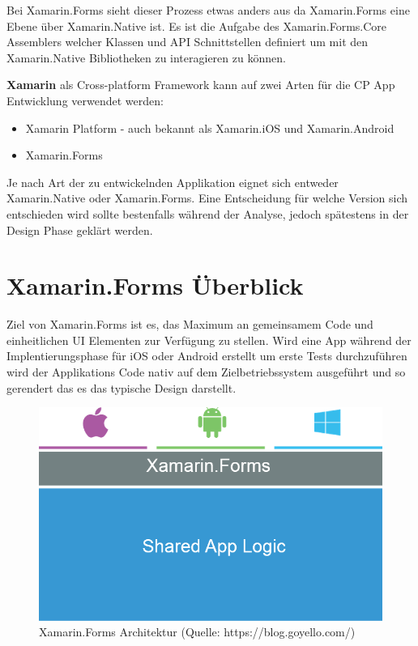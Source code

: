 	Bei Xamarin.Forms sieht dieser Prozess etwas anders aus da Xamarin.Forms eine Ebene über Xamarin.Native ist. Es ist die Aufgabe des Xamarin.Forms.Core Assemblers welcher Klassen und API Schnittstellen definiert um mit den Xamarin.Native Bibliotheken zu interagieren zu können.

	\textbf{Xamarin} als Cross-platform Framework kann auf zwei Arten für die CP App Entwicklung verwendet werden:
	\begin{itemize}
		\setlength\itemsep{0em}
		\item Xamarin Platform - auch bekannt als Xamarin.iOS und Xamarin.Android
		\item Xamarin.Forms
	\end{itemize}
	Je nach Art der zu entwickelnden Applikation eignet sich entweder Xamarin.Native oder Xamarin.Forms. Eine Entscheidung für welche Version sich entschieden wird sollte bestenfalls während der Analyse, jedoch spätestens in der Design Phase geklärt werden.

\section{Xamarin.Forms Überblick}
\label{sec:xamrinformsoverview}

	Ziel von Xamarin.Forms ist es, das Maximum an gemeinsamem Code und einheitlichen UI Elementen zur Verfügung zu stellen. Wird eine App während der Implentierungsphase für iOS oder Android erstellt um erste Tests durchzuführen wird der Applikations Code nativ auf dem Zielbetriebssystem ausgeführt \cite{book:Xamarin.Forms-Essentials:} und so gerendert das es das typische Design darstellt.

	\begin{figure}[h!]
		\centering
		\includegraphics[width=1\textwidth]{images/code-sharing2.png}
		\caption{Xamarin.Forms Architektur (Quelle: https://blog.goyello.com/)}
		\label{fig:xamarinarchitectur}
	\end{figure}

